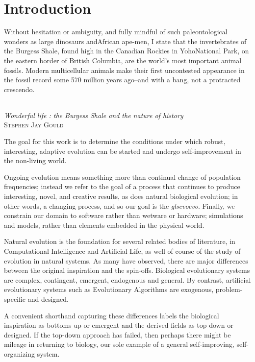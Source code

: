 \chapter{Introduction}\label{introduction}

\settowidth{\epigraphwidth}{Wonderful life : the Burgess Shale and the nature of history}
\epigraph{%
Without hesitation or ambiguity, and fully mindful of such paleontological wonders as large dinosaurs andAfrican ape-men, I state that the invertebrates of the Burgess Shale, found high in the Canadian Rockies in YohoNational Park, on the eastern border of British Columbia, are the world's most important animal fossils. Modern multicellular animals make their first uncontested appearance in the fossil record some 570 million years ago--and with a bang, not a protracted crescendo.}%
{\textit{\\Wonderful life : the Burgess Shale and the nature of history}\\\textsc{Stephen Jay Gould}}

The goal for this work is to determine the conditions under which robust, interesting, adaptive evolution can be started and undergo self-improvement in the non-living world. 

Ongoing evolution means something more than continual change of population frequencies; instead we refer to the goal of a process that continues to produce interesting, novel, and creative results, as does natural biological evolution; in other words, a changing process, and so our goal is the \textit{gls{evoevo}}. Finally, we constrain our domain to software rather than wetware or hardware; simulations and models, rather than elements embedded in the physical world.

Natural evolution is the foundation for several related bodies of literature, in Computational Intelligence and Artificial Life, as well of course of the study of evolution in natural systems. As many have observed, there are major differences between the original inspiration and the spin-offs. Biological evolutionary systems are complex, contingent, emergent, endogenous and general. By contrast, artificial evolutionary systems such as Evolutionary Algorithms are exogenous, problem-specific and designed.

A convenient shorthand capturing these differences labels the biological inspiration as bottoms-up or emergent and the derived fields as top-down or designed. If the top-down approach has failed, then perhaps there might be mileage in returning to biology, our sole example of a general self-improving, self-organizing system.

